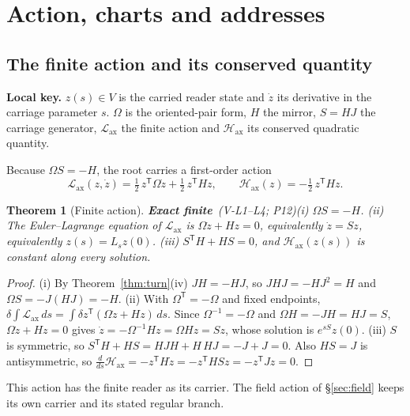 \documentclass[11pt,a4paper]{article}
\newcommand{\tp}{^{\mathsf T}}
\newcommand{\Lag}{\mathcal{L}_{\mathrm{ax}}}\newcommand{\Hax}{\mathcal{H}_{\mathrm{ax}}}
\newcommand{\st}[1]{\textsf{\small\textbf{#1}}}
\newcommand{\Sfin}{\st{Exact finite}}\newcommand{\Sder}{\st{Exact derived}}
\newcommand{\lkey}[1]{\par\noindent\textbf{Local key.} #1\par\smallskip}
\theoremstyle{plain}
\newtheorem{thm}{Theorem}[section]
\theoremstyle{definition}
\theoremstyle{remark}
\begin{document}
\section{Action, charts and addresses}\label{sec:charts}

\subsection{The finite action and its conserved quantity}
\lkey{$z(s)\in V$ is the carried reader state and $\dot z$ its derivative in the carriage parameter $s$. $\Omega$ is the oriented-pair form, $H$ the mirror, $S=HJ$ the carriage generator, $\Lag$ the finite action and $\Hax$ its conserved quadratic quantity.}
Because $\Omega S=-H$, the root carries a first-order action
\[
\Lag(z,\dot z)=\tfrac12\,z\tp\Omega\dot z+\tfrac12\,z\tp Hz,\qquad \Hax(z)=-\tfrac12\,z\tp Hz .
\]
\begin{thm}[Finite action]\Sfin\ \textit{(V-L1--L4; P12)}\label{thm:action}
(i) $\Omega S=-H$. (ii) The Euler--Lagrange equation of $\Lag$ is $\Omega\dot z+Hz=0$, equivalently $\dot z=Sz$, equivalently $z(s)=L_sz(0)$. (iii) $S\tp H+HS=0$, and $\Hax(z(s))$ is constant along every solution.
\end{thm}
\begin{proof}
(i) By Theorem~\ref{thm:turn}(iv) $JH=-HJ$, so $JHJ=-HJ^2=H$ and $\Omega S=-J(HJ)=-H$. (ii) With $\Omega\tp=-\Omega$ and fixed endpoints, $\delta\!\int\!\Lag\,ds=\int\delta z\tp(\Omega\dot z+Hz)\,ds$. Since $\Omega^{-1}=-\Omega$ and $\Omega H=-JH=HJ=S$, $\Omega\dot z+Hz=0$ gives $\dot z=-\Omega^{-1}Hz=\Omega Hz=Sz$, whose solution is $e^{sS}z(0)$. (iii) $S$ is symmetric, so $S\tp H+HS=HJH+H\,HJ=-J+J=0$. Also $HS=J$ is antisymmetric, so $\tfrac{d}{ds}\Hax=-z\tp H\dot z=-z\tp HSz=-z\tp Jz=0$.
\end{proof}
This action has the finite reader as its carrier. The field action of \S\ref{sec:field} keeps its own carrier and its stated regular branch.
\end{document}
